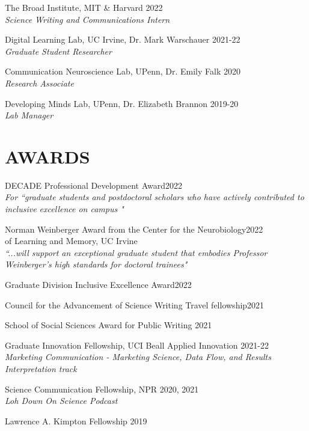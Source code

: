 \documentclass[margin, 10pt]{res} %
\begin{document}
\begin{resume}
{The Broad Institute, MIT \& Harvard} \hfill 2022 \\
{\sl Science Writing and Communications Intern}

{Digital Learning Lab, UC Irvine, Dr. Mark Warschauer} \hfill 2021-22 \\
{\sl Graduate Student Researcher}

{Communication Neuroscience Lab, UPenn, Dr. Emily Falk} \hfill 2020 \\
{\sl Research Associate}

{Developing Minds Lab, UPenn, Dr. Elizabeth Brannon} \hfill 2019-20 \\
{\sl Lab Manager}


 
\section{AWARDS}
{DECADE Professional Development Award}\hfill 2022\\
{\sl For ``graduate students and postdoctoral scholars who have actively contributed to inclusive excellence on campus "}

{Norman Weinberger Award from the Center for the Neurobiology}\hfill 2022\\
{of Learning and Memory, UC Irvine}\\
{\sl ``...will support an exceptional graduate student that embodies Professor Weinberger's high standards for doctoral trainees"}

{Graduate Division Inclusive Excellence Award}\hfill 2022

{Council for the Advancement of Science Writing Travel fellowship}\hfill 2021

{School of Social Sciences Award for Public Writing} \hfill 2021

{Graduate Innovation Fellowship, UCI Beall Applied Innovation} \hfill 2021-22 \\
{\sl Marketing Communication - Marketing
Science, Data Flow, and Results \\Interpretation track}

{Science Communication Fellowship, NPR} \hfill 2020, 2021 \\
{\sl Loh Down On Science Podcast}

{Lawrence A. Kimpton Fellowship} \hfill 2019 


\end{resume}
\end{document}
